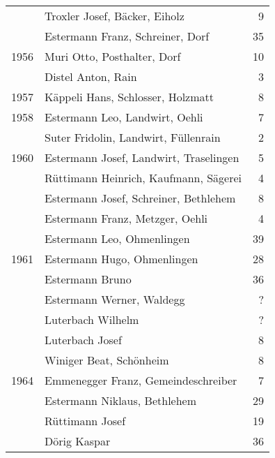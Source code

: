 {\begin{longtable}{ l l r }
                      & Troxler Josef, Bäcker, Eiholz             & 9           \\
                      & Estermann Franz, Schreiner, Dorf          & 35          \\
        1956          & Muri Otto, Posthalter, Dorf               & 10          \\
                      & Distel Anton, Rain                        & 3           \\
        1957          & Käppeli Hans, Schlosser, Holzmatt         & 8           \\
        1958          & Estermann Leo, Landwirt, Oehli            & 7           \\
                      & Suter Fridolin, Landwirt, Füllenrain      & 2           \\
        1960          & Estermann Josef, Landwirt, Traselingen    & 5           \\
                      & Rüttimann Heinrich, Kaufmann, Sägerei     & 4           \\
                      & Estermann Josef, Schreiner, Bethlehem     & 8           \\
                      & Estermann Franz, Metzger, Oehli           & 4           \\
                      & Estermann Leo, Ohmenlingen                & 39          \\
        1961          & Estermann Hugo, Ohmenlingen               & 28          \\
                      & Estermann Bruno                           & 36          \\
                      & Estermann Werner, Waldegg                 & ?           \\
                      & Luterbach Wilhelm                         & ?           \\
                      & Luterbach Josef                           & 8           \\
                      & Winiger Beat, Schönheim                   & 8           \\
        1964          & Emmenegger Franz, Gemeindeschreiber       & 7           \\
                      & Estermann Niklaus, Bethlehem              & 29          \\
                      & Rüttimann Josef                           & 19          \\
                      & Dörig Kaspar                              & 36          \\

\end{longtable}}
